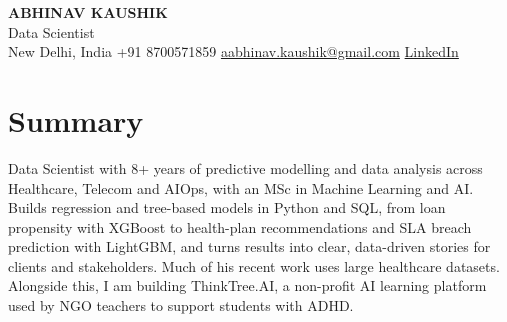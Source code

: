 \documentclass[10pt,a4paper]{article}
\begin{document}
\begin{center}
  {\LARGE\bfseries ABHINAV KAUSHIK}\\[2pt]
  {\large Data Scientist}\\[2pt]
  New Delhi, India \textbar{} +91 8700571859 \textbar{} \href{mailto:aabhinav.kaushik@gmail.com}{aabhinav.kaushik@gmail.com} \textbar{} \href{https://www.linkedin.com/in/abhinav-kaushik10/}{LinkedIn}  
\end{center}

\section{Summary}
Data Scientist with 8+ years of predictive modelling and data analysis across Healthcare, Telecom and AIOps, with an MSc in Machine Learning and AI. Builds regression and tree-based models in Python and SQL, from loan propensity with XGBoost to health-plan recommendations and SLA breach prediction with LightGBM, and turns results into clear, data-driven stories for clients and stakeholders. Much of his recent work uses large healthcare datasets. Alongside this, I am building ThinkTree.AI, a non-profit AI learning platform used by NGO teachers to support students with ADHD.
\end{document}
